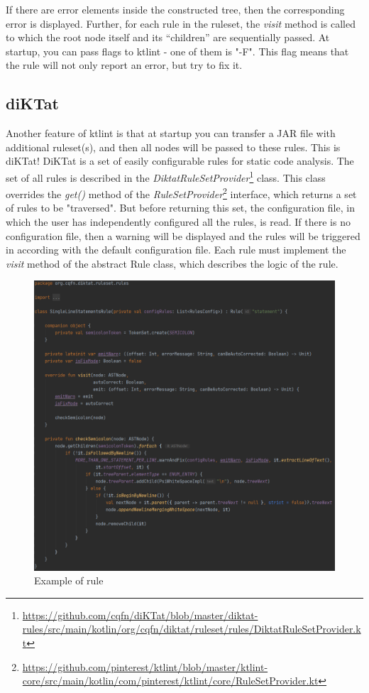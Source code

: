 If there are error elements inside the constructed tree, then the corresponding error is displayed. Further, for each rule in the ruleset, the \textsl{visit} method is called to which the root node itself and its “children” are sequentially passed.
At startup, you can pass flags to ktlint - one of them is "-F". This flag means that the rule will not only report an error, but try to fix it.

\subsection{diKTat}
\par
Another feature of ktlint is that at startup you can transfer a JAR file with additional ruleset(s), and then all nodes will be passed to these rules. This is diKTat! DiKTat is a set of easily configurable rules for static code analysis. 
The set of all rules is described in the \textsl{DiktatRuleSetProvider}\footnote{\url{https://github.com/cqfn/diKTat/blob/master/diktat-rules/src/main/kotlin/org/cqfn/diktat/ruleset/rules/DiktatRuleSetProvider.kt}} class. This class overrides the \textsl{get()} method of the \textsl{RuleSetProvider}\footnote{\url{https://github.com/pinterest/ktlint/blob/master/ktlint-core/src/main/kotlin/com/pinterest/ktlint/core/RuleSetProvider.kt}} interface, which returns a set of rules to be "traversed". But before returning this set, the configuration file, in which the user has independently configured all the rules, is read. If there is no configuration file, then a warning will be displayed and the rules will be triggered in according with the default configuration file. 
Each rule must implement the \textsl{visit} method of the abstract Rule class, which describes the logic of the rule.

\begin{figure}[H]
  \centering
  \includegraphics[scale=0.5]{wp/pictures/ruleExample.PNG}
  \caption{Example of rule}   
\end{figure} 

